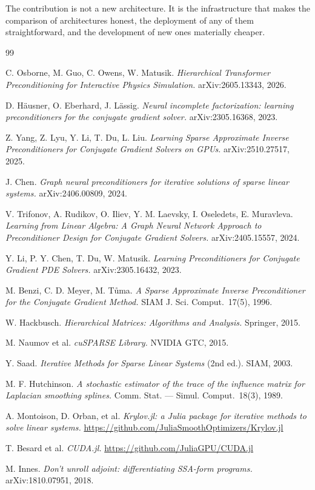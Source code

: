 \documentclass[11pt]{article}
\begin{document}
The contribution is not a new architecture. It is the infrastructure that makes the comparison of architectures honest, the deployment of any of them straightforward, and the development of new ones materially cheaper.

\begin{thebibliography}{99}
\small

C. Osborne, M. Guo, C. Owens, W. Matusik.
\emph{Hierarchical Transformer Preconditioning for Interactive Physics Simulation.}
arXiv:2605.13343, 2026.

D. H\"ausner, O. Eberhard, J. L\"assig.
\emph{Neural incomplete factorization: learning preconditioners for the conjugate gradient solver.}
arXiv:2305.16368, 2023.

Z. Yang, Z. Lyu, Y. Li, T. Du, L. Liu.
\emph{Learning Sparse Approximate Inverse Preconditioners for Conjugate Gradient Solvers on GPUs.}
arXiv:2510.27517, 2025.

J. Chen.
\emph{Graph neural preconditioners for iterative solutions of sparse linear systems.}
arXiv:2406.00809, 2024.

V. Trifonov, A. Rudikov, O. Iliev, Y. M. Laevsky, I. Oseledets, E. Muravleva.
\emph{Learning from Linear Algebra: A Graph Neural Network Approach to Preconditioner Design for Conjugate Gradient Solvers.}
arXiv:2405.15557, 2024.

Y. Li, P. Y. Chen, T. Du, W. Matusik.
\emph{Learning Preconditioners for Conjugate Gradient PDE Solvers.}
arXiv:2305.16432, 2023.

M. Benzi, C. D. Meyer, M. T\r{u}ma.
\emph{A Sparse Approximate Inverse Preconditioner for the Conjugate Gradient Method.}
SIAM J. Sci. Comput.\ 17(5), 1996.

W. Hackbusch.
\emph{Hierarchical Matrices: Algorithms and Analysis.}
Springer, 2015.

M. Naumov et al.
\emph{cuSPARSE Library.}
NVIDIA GTC, 2015.

Y. Saad.
\emph{Iterative Methods for Sparse Linear Systems} (2nd ed.).
SIAM, 2003.

M. F. Hutchinson.
\emph{A stochastic estimator of the trace of the influence matrix for Laplacian smoothing splines.}
Comm. Stat. --- Simul. Comput.\ 18(3), 1989.

A. Montoison, D. Orban, et al.
\emph{Krylov.jl: a Julia package for iterative methods to solve linear systems.}
\url{https://github.com/JuliaSmoothOptimizers/Krylov.jl}

T. Besard et al.
\emph{CUDA.jl.}
\url{https://github.com/JuliaGPU/CUDA.jl}

M. Innes.
\emph{Don't unroll adjoint: differentiating SSA-form programs.}
arXiv:1810.07951, 2018.

\end{thebibliography}
\end{document}
